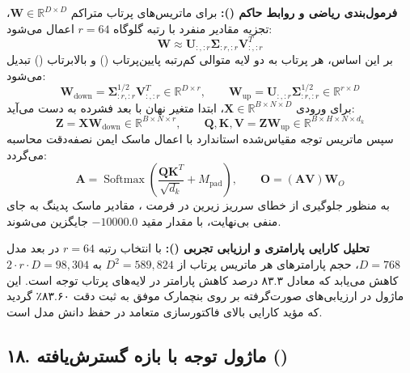 \textbf{فرمول‌بندی ریاضی و روابط حاکم ():}
برای ماتریس‌های پرتاب متراکم $\mathbf{W} \in \mathbb{R}^{D \times D}$، تجزیه مقادیر منفرد با رتبه گلوگاه $r = 64$ اعمال می‌شود:
\begin{equation}
\mathbf{W} \approx \mathbf{U}_{:, :r} \mathbf{\Sigma}_{:r, :r} \mathbf{V}_{:, :r}^T
\end{equation}
بر این اساس، هر پرتاب به دو لایه متوالی کم‌رتبه پایین‌پرتاب () و بالابرتاب () تبدیل می‌شود:
\begin{equation}
\mathbf{W}_{\text{down}} = \mathbf{\Sigma}_{:r, :r}^{1/2} \mathbf{V}_{:, :r}^T \in \mathbb{R}^{D \times r}, \qquad
\mathbf{W}_{\text{up}} = \mathbf{U}_{:, :r} \mathbf{\Sigma}_{:r, :r}^{1/2} \in \mathbb{R}^{r \times D}
\end{equation}
برای ورودی $\mathbf{X} \in \mathbb{R}^{B \times N \times D}$، ابتدا متغیر نهان با بعد فشرده به دست می‌آید:
\begin{equation}
\mathbf{Z} = \mathbf{X} \mathbf{W}_{\text{down}} \in \mathbb{R}^{B \times N \times r}, \qquad
\mathbf{Q}, \mathbf{K}, \mathbf{V} = \mathbf{Z} \mathbf{W}_{\text{up}} \in \mathbb{R}^{B \times H \times N \times d_k}
\end{equation}
سپس ماتریس توجه مقیاس‌شده استاندارد با اعمال ماسک ایمن نصفه‌دقت محاسبه می‌گردد:
\begin{equation}
\mathbf{A} = \operatorname{Softmax}\left(\frac{\mathbf{Q} \mathbf{K}^T}{\sqrt{d_k}} + M_{\text{pad}}\right), \qquad
\mathbf{O} = (\mathbf{A} \mathbf{V}) \mathbf{W}_O
\end{equation}
به منظور جلوگیری از خطای سرریز زیرین در فرمت ، مقادیر ماسک پدینگ به جای منفی بی‌نهایت، با مقدار مقید $-10000.0$ جایگزین می‌شوند.

\textbf{تحلیل کارایی پارامتری و ارزیابی تجربی ():}
با انتخاب رتبه $r = 64$ در بعد مدل $D = 768$، حجم پارامترهای هر ماتریس پرتاب از $D^2 = 589,824$ به $2 \cdot r \cdot D = 98,304$ کاهش می‌یابد که معادل ۸۳.۳ درصد کاهش پارامتر در لایه‌های پرتاب توجه است. این ماژول در ارزیابی‌های صورت‌گرفته بر روی بنچمارک  موفق به ثبت دقت ۸۳.۶۰٪ گردید که مؤید کارایی بالای فاکتورسازی متعامد در حفظ دانش مدل است.



\subsection*{۱۸. ماژول توجه با بازه گسترش‌یافته  ()}

